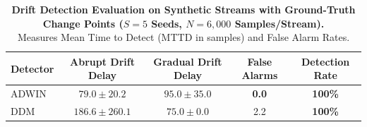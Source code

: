 \begin{table}[t]
\centering
\caption{\textbf{Drift Detection Evaluation on Synthetic Streams with Ground-Truth Change Points ($S=5$ Seeds, $N=6{,}000$ Samples/Stream).}\\Measures Mean Time to Detect (MTTD in samples) and False Alarm Rates.}
\label{tab:drift_detection_benchmark}
\small
\begin{tabularx}{0.48\textwidth}{l c c c c}
\toprule
\textbf{Detector} & \textbf{Abrupt Drift Delay} & \textbf{Gradual Drift Delay} & \textbf{False Alarms} & \textbf{Detection Rate} \\
\midrule
ADWIN & $79.0 \pm 20.2$ & $95.0 \pm 35.0$ & \textbf{0.0} & \textbf{100\%} \\
DDM   & $186.6 \pm 260.1$ & \textbf{$75.0 \pm 0.0$} & 2.2 & \textbf{100\%} \\
\bottomrule
\end{tabularx}
\end{table}
